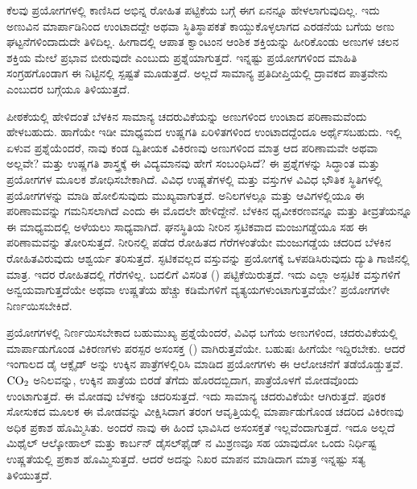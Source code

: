 ಕೆಲವು ಪ್ರಯೋಗಗಳಲ್ಲಿ ಕಾಣಿಸಿದ ಅಭಿನ್ನ ರೋಹಿತ ಪಟ್ಟಿಕೆಯ ಬಗ್ಗೆ ಈಗ ಏನನ್ನೂ ಹೇಳಲಾಗುವುದಿಲ್ಲ. ಇದು ಅಣುವಿನ ಮಾರ್ಪಾಡಿನಿಂದ ಉಂಟಾದದ್ದೇ ಅಥವಾ ಸ್ಥಿತಿಸ್ಥಾಪಕತೆ ಕಾಯ್ದುಕೊಳ್ಳಲಾಗದ ಎರಡನೆಯ ಬಗೆಯ ಅಣು ಘಟ್ಟನೆಗಳಿಂದಾದುದೇ ತಿಳಿದಿಲ್ಲ. ಹೀಗಾದಲ್ಲಿ ಆಪಾತ ಕ್ವಾಂಟಂನ ಆಂಶಿಕ ಶಕ್ತಿಯನ್ನು ಹೀರಿಕೊಂಡು ಅಣುಗಳ ಚಲನ ಶಕ್ತಿಯ ಮೇಲೆ ಪ್ರಭಾವ ಬೀರುವುದೇ ಎಂಬುದು ಪ್ರಶ್ನೆಯಾಗುತ್ತದೆ. ಇನ್ನಷ್ಟು ಪ್ರಯೋಗಗಳಿಂದ ಮಾಹಿತಿ ಸಂಗ್ರಹಗೊಂಡಾಗ ಈ ನಿಟ್ಟಿನಲ್ಲಿ ಸ್ಪಷ್ಟತೆ ಮೂಡುತ್ತದೆ. ಅಲ್ಲದೆ ಸಾಮಾನ್ಯ ಪ್ರತಿದೀಪ್ತಿಯಲ್ಲಿ ದ್ರಾವಕದ ಪಾತ್ರವೇನು ಎಂಬುದರ ಬಗ್ಗೆಯೂ ತಿಳಿಯುತ್ತದೆ.



ಪೀಠಕೆಯಲ್ಲಿ ಹೇಳಿದಂತೆ ಬೆಳಕಿನ ಸಾಮಾನ್ಯ ಚದರುವಿಕೆಯನ್ನು ಅಣುಗಳಿಂದ ಉಂಟಾದ ಪರಿಣಾಮವೆಂದು ಹೇಳಬಹುದು. ಹಾಗೆಯೇ ಇಡೀ ಮಾಧ್ಯಮದ ಉಷ್ಣಗತಿ ಏರಿಳಿತಗಳಿಂದ ಉಂಟಾದದ್ದೆಂದೂ ಅರ್ಥೈಸಬಹುದು. ಇಲ್ಲಿ ಏಳುವ ಪ್ರಶ್ನೆಯೆಂದರೆ, ನಾವು ಕಂಡ ದ್ವಿತೀಯಕ ವಿಕಿರಣವು ಅಣುಗಳಿಂದ ಮಾತ್ರ ಆದ ಪರಿಣಾಮವೇ ಅಥವಾ ಅಲ್ಲವೇ? ಮತ್ತು ಉಷ್ಣಗತಿ ಶಾಸ್ತ್ರಕ್ಕೆ ಈ ವಿದ್ಯಮಾನವು ಹೇಗೆ ಸಂಬಂಧಿಸಿದೆ? ಈ ಪ್ರಶ್ನೆಗಳನ್ನು ಸಿದ್ಧಾಂತ ಮತ್ತು ಪ್ರಯೋಗಗಳ ಮೂಲಕ ಶೋಧಿಸಬೇಕಾಗಿದೆ. ವಿವಿಧ ಉಷ್ಣತೆಗಳಲ್ಲಿ ಮತ್ತು ವಸ್ತುಗಳ ವಿವಿಧ ಭೌತಿಕ ಸ್ಥಿತಿಗಳಲ್ಲಿ ಪ್ರಯೋಗಗಳನ್ನು ಮಾಡಿ ಹೋಲಿಸುವುದು ಮುಖ್ಯವಾಗುತ್ತದೆ. ಅನಿಲಗಳಲ್ಲೂ ಮತ್ತು ಆವಿಗಳಲ್ಲಿಯೂ ಈ ಪರಿಣಾಮವನ್ನು ಗಮನಿಸಲಾಗಿದೆ ಎಂದು ಈ ಮೊದಲೇ ಹೇಳಿದ್ದೇನೆ. ಬೆಳಕಿನ ಧೃವೀಕರಣವನ್ನೂ ಮತ್ತು ತೀವ್ರತೆಯನ್ನೂ ಈ ಮಾಧ್ಯಮದಲ್ಲಿ ಅಳೆಯಲು ಸಾಧ್ಯವಾಗಿದೆ. ಘನಸ್ಥಿತಿಯ ನೀರಿನ ಸ್ಫಟಿಕವಾದ ಮಂಜುಗಡ್ಡೆಯೂ ಸಹ ಈ ಪರಿಣಾಮವನ್ನು ತೋರಿಸುತ್ತದೆ. ನೀರಿನಲ್ಲಿ ಪಡೆದ ರೋಹಿತದ ಗೆರೆಗಳಂತೆಯೇ ಮಂಜುಗಡ್ಡೆಯ ಚದರಿದ ಬೆಳಕಿನ ರೋಹಿತವಿರುವುದು ಆಶ್ವರ್ಯ ತರಿಸುತ್ತದೆ. ಸ್ಫಟಿಕವಲ್ಲದ ವಸ್ತುವನ್ನು ಪ್ರಯೋಗಕ್ಕೆ ಒಳಪಡಿಸಿರುವುದು ದ್ಯುತಿ ಗಾಜಿನಲ್ಲಿ ಮಾತ್ರ. ಇದರ ರೋಹಿತದಲ್ಲಿ ಗೆರೆಗಳಿಲ್ಲ. ಬದಲಿಗೆ ವಿಸರಿತ () ಪಟ್ಟಿಕೆಯಿರುತ್ತದೆ. ಇದು ಎಲ್ಲಾ ಅಸ್ಪಟಿಕ ವಸ್ತುಗಳಿಗೆ ಅನ್ವಯವಾಗುತ್ತದೆಯೇ ಅಥವಾ ಉಷ್ಣತೆಯ ಹೆಚ್ಚು ಕಡಿಮೆಗಳಿಗೆ ವ್ಯತ್ಯಯಗಳುಂಟಾಗುತ್ತವೆಯೇ? ಪ್ರಯೋಗಗಳೇ ನಿರ್ಣಯಿಸಬೇಕಿದೆ.



ಪ್ರಯೋಗಗಳಲ್ಲಿ ನಿರ್ಣಯಿಸಬೇಕಾದ ಬಹುಮುಖ್ಯ ಪ್ರಶ್ನೆಯೆಂದರೆ, ವಿವಿಧ ಬಗೆಯ ಅಣುಗಳಿಂದ, ಚದರುವಿಕೆಯಲ್ಲಿ ಮಾರ್ಪಾಡುಗೊಂಡ ವಿಕಿರಣಗಳು ಪರಸ್ಪರ ಅಸಂಸಕ್ತ () ವಾಗಿರುತ್ತವೆಯೇ. ಬಹುಷಃ ಹೀಗೆಯೇ ಇದ್ದಿರಬೇಕು. ಆದರೆ ಇಂಗಾಲದ ಡೈ ಆಕ್ಸೈಡ್ ಅನ್ನು ಉಕ್ಕಿನ ಪಾತ್ರೆಗಳಲ್ಲಿರಿಸಿ ಮಾಡಿದ ಪ್ರಯೋಗಗಳು ಈ ಆಲೋಚನೆಗೆ ತಡೆಯೊಡ್ಡುತ್ತವೆ. ${\rm CO}_2$ ಅನಿಲವನ್ನು, ಉಕ್ಕಿನ ಪಾತ್ರೆಯ ಬಿರಡೆ ತೆಗೆದು ಹೊರದಬ್ಬಿದಾಗ, ಪಾತ್ರೆಯೊಳಗೆ ಮೋಡವೊಂದು ಉಂಟಾಗುತ್ತದೆ. ಈ ಮೋಡವು ಬೆಳಕನ್ನು ಚದರಿಸುತ್ತದೆ. ಇದು ಸಾಮಾನ್ಯ ಚದರುವಿಕೆಯೇ ಆಗಿರುತ್ತದೆ. ಪೂರಕ ಸೋಸುಕದ ಮೂಲಕ ಈ ಮೋಡವನ್ನು ವೀಕ್ಷಿಸಿದಾಗ ತರಂಗ ಆವೃತ್ತಿಯಲ್ಲಿ ಮಾರ್ಪಾಡುಗೊಂಡ ಚದರಿದ ವಿಕಿರಣವು ಅಧಿಕ ಪ್ರಕಾಶ ಹೊಮ್ಮಿಸಿತು. ಅಂದರೆ ನಾವು ಈ ಹಿಂದೆ ಭಾವಿಸಿದ ಅಸಂಸಕ್ತತೆ ಇಲ್ಲವೆಂದಾಗುತ್ತದೆ. ಇದೂ ಅಲ್ಲದೆ ಮಿಥೈಲ್ ಆಲ್ಕೋಹಾಲ್ ಮತ್ತು ಕಾರ್ಬನ್ ಡೈಸಲ್‍ಫೈಡ್ ನ ಮಿಶ್ರಣವೂ ಸಹ ಯಾವುದೋ ಒಂದು ನಿರ್ಧಿಷ್ಟ ಉಷ್ಣತೆಯಲ್ಲಿ ಪ್ರಕಾಶ ಹೊಮ್ಮಿಸುತ್ತದೆ. ಆದರೆ ಅದನ್ನು ನಿಖರ ಮಾಪನ ಮಾಡಿದಾಗ ಮಾತ್ರ ಇನ್ನಷ್ಟು ಸತ್ಯ ತಿಳಿಯುತ್ತದೆ.


